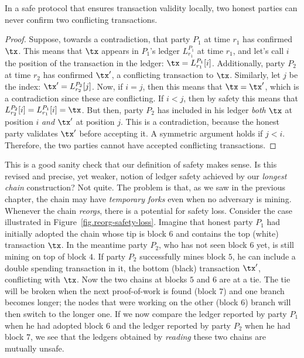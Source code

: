 \begin{lemma}
In a safe protocol that ensures transaction validity locally,
two honest parties can never confirm two conflicting transactions.
\end{lemma}
\begin{proof}
Suppose, towards a contradiction, that party $P_1$ at time $r_1$ has confirmed $\tx$. This means that $\tx$ appears in $P_1$'s
ledger $L^{P_1}_{r_1}$ at time $r_1$, and let's call $i$ the position of the transaction in the ledger: $\tx = L^{P_1}_{r_1}[i]$.
Additionally, party $P_2$ at time $r_2$ has confirmed $\tx'$, a conflicting transaction to $\tx$. Similarly, let $j$ be the index:
$\tx' = L^{P_2}_{r_2}[j]$. Now, if $i = j$, then this means that $\tx = \tx'$, which is a contradiction since these are conflicting.
If $i < j$, then by safety this means that $L^{P_2}_{r_2}[i] = L^{P_1}_{r_1}[i] = \tx$. But then, party $P_2$ has included
in his ledger \emph{both} $\tx$ at position $i$ \emph{and} $\tx'$ at position $j$. This is a contradiction, because the honest
party validates $\tx'$ before accepting it. A symmetric argument holds if $j < i$.
Therefore, the two parties cannot have accepted conflicting transactions.
\end{proof}

This is a good sanity check that our definition of safety makes sense. Is this revised and precise, yet weaker, notion of ledger
safety achieved by our \emph{longest chain} construction? Not quite. The problem is that, as we saw in the previous chapter,
the chain may have \emph{temporary forks} even when no adversary is mining. Whenever the chain \emph{reorgs}, there is a
potential for safety loss. Consider the case illustrated in Figure~\ref{fig.reorg-safety-loss}. Imagine that honest party
$P_1$ had initially adopted the chain whose tip is block $6$ and contains the top (white) transaction $\tx$. In the meantime
party $P_2$, who has not seen block $6$ yet, is still mining on top of block $4$. If party $P_2$ successfully mines block
$5$, he can include a double spending transaction in it, the bottom (black) transaction $\tx'$, conflicting with $\tx$.
Now the two chains at blocks $5$ and $6$ are at a tie. The tie will be broken when the next proof-of-work
is found (block $7$) and one branch becomes longer; the nodes that were working on the other
(block $6$) branch will then switch to the longer one. If we now compare the ledger reported by party $P_1$ when he
had adopted block $6$ and the ledger reported by party $P_2$ when he had block $7$, we see that the
ledgers obtained by \emph{reading} these two chains are mutually unsafe.

